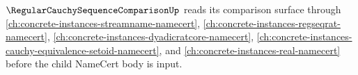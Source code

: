 $\RegularCauchySequenceComparisonUp$ reads its comparison surface through \autoref{ch:concrete-instances-streamname-namecert}, \autoref{ch:concrete-instances-regseqrat-namecert}, \autoref{ch:concrete-instances-dyadicratcore-namecert}, \autoref{ch:concrete-instances-cauchy-equivalence-setoid-namecert}, and \autoref{ch:concrete-instances-real-namecert} before the child NameCert body is input.


